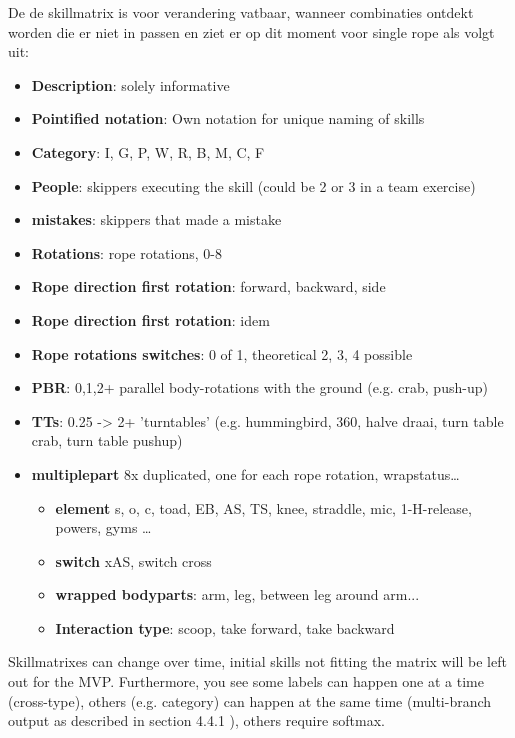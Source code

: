 De de skillmatrix is voor verandering vatbaar, wanneer combinaties ontdekt worden die er niet in passen en ziet er op dit moment voor single rope als volgt uit:

\begin{itemize}
    \item \textbf{Description}: solely informative
    \item \textbf{Pointified notation}: Own notation for unique naming of skills
    \item \textbf{Category}: I, G, P, W, R, B, M, C, F
    \item \textbf{People}: skippers executing the skill (could be 2 or 3 in a team exercise)
    \item \textbf{mistakes}: skippers that made a mistake
    \item \textbf{Rotations}: rope rotations, 0-8
    \item \textbf{Rope direction first rotation}: forward, backward, side
    \item \textbf{Rope direction first rotation}: idem
    \item \textbf{Rope rotations switches}: 0 of 1, theoretical 2, 3, 4 possible
    \item \textbf{PBR}: 0,1,2+ parallel body-rotations with the ground (e.g. crab, push-up)
    \item \textbf{TTs}: 0.25 -> 2+ 'turntables' (e.g. hummingbird, 360, halve draai, turn table crab, turn table pushup)
    \item \textbf{multiplepart} 8x duplicated, one for each rope rotation, wrapstatus\dots
    \begin{itemize}
        \item \textbf{element} s, o, c, toad, EB, AS, TS, knee, straddle, mic, 1-H-release, powers, gyms \dots
        \item \textbf{switch} xAS, switch cross
        \item \textbf{wrapped bodyparts}: arm, leg, between leg around arm...
        \item \textbf{Interaction type}: scoop, take forward, take backward
    \end{itemize}
\end{itemize}

    
Skillmatrixes can change over time, initial skills not fitting the matrix will be left out for the MVP.
Furthermore, you see some labels can happen one at a time (cross-type), others (e.g. category) can happen at the same time (multi-branch output as described in section 4.4.1 \autocite{Coulibaly_2022}), others require softmax.

